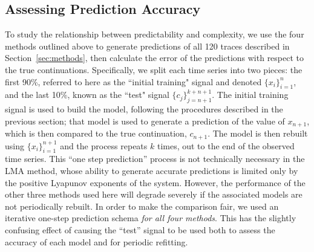 \documentclass[%
pre,
reprint,
superscriptaddress,
showpacs,
nofootinbib,
nobibnotes,
 amsmath,amssymb,
 aps,
]{revtex4-1}
\begin{document}
\subsection{Assessing Prediction Accuracy}
\label{sec:accuracy}

To study the relationship between predictability and complexity, we
use the four methods outlined above to generate predictions of all 120
traces described in Section~\ref{sec:methods}, then calculate the
error of the predictions with respect to the true continuations.
Specifically, we split each time series into two pieces: the first
90\%, referred to here as the ``initial training" signal and denoted
$\{x_i\}_{i=1}^{n}$, and the last 10\%, known as the ``test" signal
$\{c_j\}_{j=n+1}^{k+n+1}$.  The initial training signal is used to
build the model, following the procedures described in the previous
section; that model is used to generate a prediction of the value of
$x_{n+1}$, which is then compared to the true continuation, $c_{n+1}$.
The model is then rebuilt using $\{x_i\}_{i=1}^{n+1}$ and the process
repeats $k$ times, out to the end of the observed time series.  This
``one step prediction'' process is not technically necessary in the
LMA method, whose ability to generate accurate predictions is limited
only by the positive Lyapunov exponents of the system.  However, the
performance of the other three methods used here will degrade severely
if the associated models are not periodically rebuilt.  In order to
make the comparison fair, we used an iterative one-step prediction
schema \emph{for all four methods}.  This has the slightly confusing
effect of causing the ``test'' signal to be used both to assess the
accuracy of each model and for periodic refitting.
\end{document}
